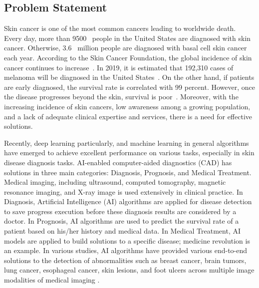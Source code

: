 \documentclass[sensors,article,accept,pdftex,moreauthors]{Definitions/mdpi}
\begin{document}
	\subsection{Problem Statement}
	{Skin cancer is one of the most common cancers leading to worldwide death. {Every day, more than 9500~\mbox{\cite{03358}} }%
	people in the United States are diagnosed with skin cancer. Otherwise, 3.6~\mbox{\cite{03358}} million people are diagnosed with basal cell skin cancer each year. According to the Skin Cancer Foundation, the global incidence of skin cancer continues to increase~\mbox{\cite{11872}}. In 2019, it is estimated that 192,310 cases of melanoma will be diagnosed in the United States~\mbox{\cite{11872}}. On the other hand, if patients are early diagnosed, the survival rate is correlated with 99 percent. However, once the disease progresses beyond the skin, survival is poor~\mbox{\cite{11872}}. Moreover, with the increasing incidence of skin cancers, low awareness among a growing population, and a lack of adequate clinical expertise and services, there is a need for effective solutions.} 
	
	Recently, deep learning particularly, and machine learning in general algorithms have emerged to achieve excellent performance on various tasks, especially in skin disease diagnosis tasks. AI-enabled computer-aided diagnostics (CAD)\cite{11797} has solutions in three main categories: Diagnosis, Prognosis, and Medical Treatment. Medical imaging, including ultrasound, computed tomography, magnetic resonance imaging, and X-ray image is used extensively in clinical practice. In Diagnosis, Artificial Intelligence (AI) algorithms are applied for disease detection to save progress execution before these diagnosis results are considered by a doctor. In Prognosis, AI algorithms are used to predict the survival rate of a patient based on his/her history and medical data. In Medical Treatment, AI models are applied to build solutions to a specific disease; medicine revolution is an example. In various studies, AI algorithms have provided various end-to-end solutions to the detection of abnormalities such as breast cancer, brain tumors, lung cancer, esophageal cancer, skin lesions, and foot ulcers across multiple image modalities of medical imaging \cite{11872}.
	
\end{document}
